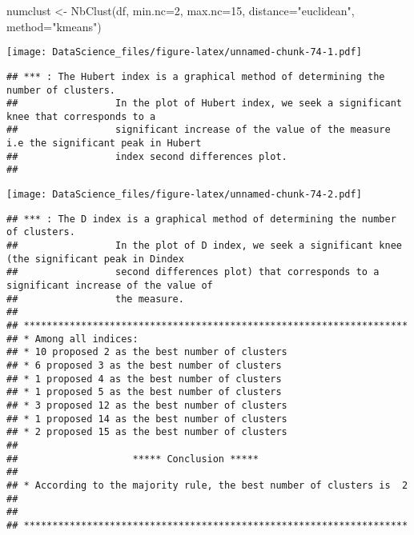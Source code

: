 \documentclass[
]{book}
\newenvironment{Shaded}{\begin{snugshade}}{\end{snugshade}}
\newcommand{\AttributeTok}[1]{\textcolor[rgb]{0.77,0.63,0.00}{#1}}
\newcommand{\DecValTok}[1]{\textcolor[rgb]{0.00,0.00,0.81}{#1}}
\newcommand{\FunctionTok}[1]{\textcolor[rgb]{0.00,0.00,0.00}{#1}}
\newcommand{\NormalTok}[1]{#1}
\newcommand{\OtherTok}[1]{\textcolor[rgb]{0.56,0.35,0.01}{#1}}
\newcommand{\SpecialCharTok}[1]{\textcolor[rgb]{0.00,0.00,0.00}{#1}}
\newcommand{\StringTok}[1]{\textcolor[rgb]{0.31,0.60,0.02}{#1}}
\begin{document}
\begin{Shaded}
\begin{Highlighting}[]
\NormalTok{numclust }\OtherTok{\textless{}{-}} \FunctionTok{NbClust}\NormalTok{(df, }\AttributeTok{min.nc=}\DecValTok{2}\NormalTok{, }\AttributeTok{max.nc=}\DecValTok{15}\NormalTok{, }\AttributeTok{distance=}\StringTok{"euclidean"}\NormalTok{, }\AttributeTok{method=}\StringTok{"kmeans"}\NormalTok{)}
\end{Highlighting}
\end{Shaded}

\texttt{[image: DataScience\_files/figure-latex/unnamed-chunk-74-1.pdf]}

\begin{verbatim}
## *** : The Hubert index is a graphical method of determining the number of clusters.
##                 In the plot of Hubert index, we seek a significant knee that corresponds to a 
##                 significant increase of the value of the measure i.e the significant peak in Hubert
##                 index second differences plot. 
## 
\end{verbatim}

\texttt{[image: DataScience\_files/figure-latex/unnamed-chunk-74-2.pdf]}

\begin{verbatim}
## *** : The D index is a graphical method of determining the number of clusters. 
##                 In the plot of D index, we seek a significant knee (the significant peak in Dindex
##                 second differences plot) that corresponds to a significant increase of the value of
##                 the measure. 
##  
## ******************************************************************* 
## * Among all indices:                                                
## * 10 proposed 2 as the best number of clusters 
## * 6 proposed 3 as the best number of clusters 
## * 1 proposed 4 as the best number of clusters 
## * 1 proposed 5 as the best number of clusters 
## * 3 proposed 12 as the best number of clusters 
## * 1 proposed 14 as the best number of clusters 
## * 2 proposed 15 as the best number of clusters 
## 
##                    ***** Conclusion *****                            
##  
## * According to the majority rule, the best number of clusters is  2 
##  
##  
## *******************************************************************
\end{verbatim}

\begin{Shaded}
\end{Shaded}
\end{document}
